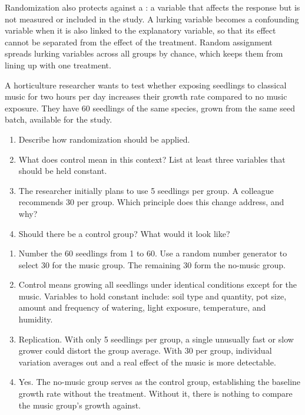 Randomization also protects against a : a variable that affects the response but is not measured or included in the study. A lurking variable becomes a confounding variable when it is also linked to the explanatory variable, so that its effect cannot be separated from the effect of the treatment. Random assignment spreads lurking variables across all groups by chance, which keeps them from lining up with one treatment.

\begin{Exercise}[title={Applying the Three Principles}, label={ex:three-principles}]
A horticulture researcher wants to test whether exposing seedlings to classical music for two hours per day increases their 
growth rate compared to no music exposure. They have 60 seedlings of the same species, grown from the same seed batch, available for 
the study.

\begin{enumerate} 
    \item Describe how randomization should be applied.
    \item What does control mean in this context? List at least three variables that should be held constant.
    \item The researcher initially plans to use 5 seedlings per group. A colleague recommends 30 per group. Which principle does 
    this change address, and why?
    \item Should there be a control group? What would it look like?
\end{enumerate}
\end{Exercise}
\begin{Answer}[ref={ex:three-principles}]
\begin{enumerate} 
    \item Number the 60 seedlings from 1 to 60. Use a random number generator to select 30 for the music group. The remaining 
    30 form the no-music group.
    \item Control means growing all seedlings under identical conditions except for the music. Variables to hold constant include: 
    soil type and quantity, pot size, amount and frequency of watering, light exposure, temperature, and humidity.
    \item Replication. With only 5 seedlings per group, a single unusually fast or slow grower could distort the group average. 
    With 30 per group, individual variation averages out and a real effect of the music is more detectable.
    \item Yes. The no-music group serves as the control group, establishing the baseline growth rate without the treatment. 
    Without it, there is nothing to compare the music group's growth against.
\end{enumerate}
\end{Answer}


